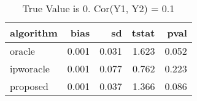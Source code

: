 \begin{table}[h!]

\caption{True Value is 0. Cor(Y1, Y2) = 0.1}
\centering
\begin{tabular}[t]{lrrrr}
\toprule
algorithm & bias & sd & tstat & pval\\
\midrule
oracle & 0.001 & 0.031 & 1.623 & 0.052\\
ipworacle & 0.001 & 0.077 & 0.762 & 0.223\\
proposed & 0.001 & 0.037 & 1.366 & 0.086\\
\bottomrule
\end{tabular}
\end{table}
